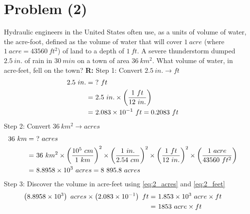\section{Problem (2)}
	Hydraulic engineers in the United States often use, as a units of volume of water, the acre-foot, defined as the volume of water that will cover $1 \ acre$ (where $1 \ acre = 43560 \ ft^{2}$) of land to a depth of $1 \ ft$. A severe thunderstorm dumped $2.5 \ in.$ of rain in $30 \ min$ on a town of area $36 \ km^{2}$. What volume of water, in acre-feet, fell on the town? \newline
	\textbf{R:} \newline
	Step 1: Convert $2.5 \ in. \to ft$
	\begin{align}
		2.5 \ in. = \ & ? \ ft & \notag \\
		= \ & 2.5 \ in.
		\times \left( \frac{1 \ ft}{12 \ in.} \right)& \notag \\
		= \ & 2.083 \times 10^{-1} \ ft  = 0.2083 \ ft&
		\label{eq:2_feet}
	\end{align}
	Step 2: Convert $36 \ km^{2} \to acres$
	\begin{align}
		36 \ km = \ & ? \ acres & \notag \\
		= \ & 36 \ km^{2}
		\times \left( \frac{10^{5} \ cm}{1 \ km} \right)^{2}
		\times \left( \frac{1 \ in.}{2.54 \ cm} \right)^{2}
		\times \left( \frac{1 \ ft}{12 \ in.} \right)^{2}
		\times \left( \frac{1 \ acre}{43560 \ ft^{2}} \right)& \notag \\
		= \ & 8.8958 \times 10^{3} \ acres  = 8 \ 895.8 \ acres&
		\label{eq:2_acres}
	\end{align}
	Step 3: Discover the volume in acre-feet using \cref{eq:2_acres} and \cref{eq:2_feet}
	\begin{align}
		\left( 8.8958 \times 10^{3} \right) \ acres
		\times
		\left( 2.083 \times 10^{-1} \right) \ ft
		= \ & 1.853 \times 10^{3} \ acre \times ft & \notag \\
		= \ & 1853 \ acre \times ft &
	\end{align}
